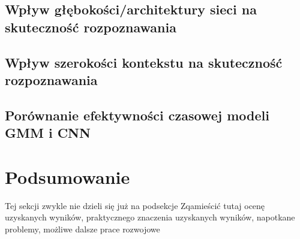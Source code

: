 \documentclass[11pt]{article}
\begin{document}
	\subsection{ Wpływ głębokości/architektury sieci na skuteczność rozpoznawania }
	\subsection{ Wpływ szerokości kontekstu na skuteczność rozpoznawania }
	\subsection{ Porównanie efektywności czasowej modeli GMM i CNN }

\section{ Podsumowanie }
  Tej sekcji zwykle nie dzieli się już na podsekcje Zqamieścić tutaj ocenę uzyskanych wyników, praktycznego znaczenia uzyskanych wyników, napotkane problemy, możliwe dalsze prace rozwojowe
   
   
	\nocite{*}
	
	
\end{document}
